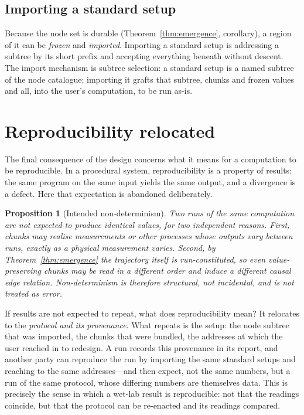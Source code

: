\documentclass[11pt,a4paper,twocolumn]{article}
\newtheorem{proposition}[theorem]{Proposition}
\theoremstyle{definition}
\begin{document}
\subsection{Importing a standard setup}

Because the node set is durable (Theorem~\ref{thm:emergence}, corollary), a
region of it can be \emph{frozen} and \emph{imported}. Importing a standard setup
is addressing a subtree by its short prefix and accepting everything beneath
without descent. The import mechanism is subtree selection: a standard setup is a
named subtree of the node catalogue; importing it grafts that subtree, chunks and
frozen values and all, into the user's computation, to be run as-is.



\section{Reproducibility relocated}
\label{sec:repro}

The final consequence of the design concerns what it means for a computation to
be reproducible. In a procedural system, reproducibility is a property of
results: the same program on the same input yields the same output, and a
divergence is a defect. Here that expectation is abandoned deliberately.

\begin{proposition}[Intended non-determinism]
\label{prop:nondeterminism}
Two runs of the same computation are not expected to produce identical values,
for two independent reasons. First, chunks may realise measurements or other
processes whose outputs vary between runs, exactly as a physical measurement
varies. Second, by Theorem~\ref{thm:emergence} the trajectory itself is
run-constituted, so even value-preserving chunks may be read in a different
order and induce a different causal edge relation. Non-determinism is therefore
structural, not incidental, and is not treated as error.
\end{proposition}

If results are not expected to repeat, what does reproducibility mean? It
relocates to the \emph{protocol and its provenance}. What repeats is the setup:
the node subtree that was imported, the chunks that were bundled, the addresses
at which the user reached in to redesign. A run records this provenance in its
report, and another party can reproduce the run by importing the same standard
setups and reaching to the same addresses---and then expect, not the same
numbers, but a run of the same protocol, whose differing numbers are themselves
data. This is precisely the sense in which a wet-lab result is reproducible: not
that the readings coincide, but that the protocol can be re-enacted and its
readings compared.
\end{document}
